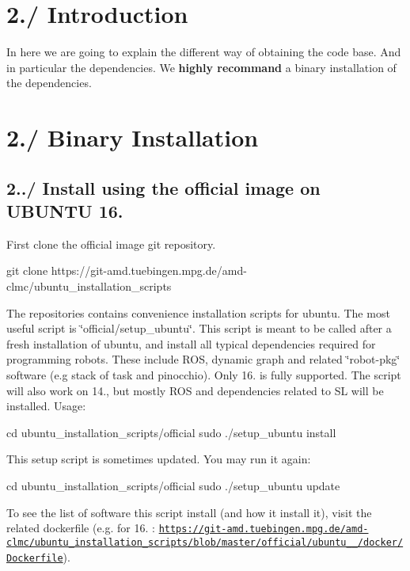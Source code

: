 \hypertarget{subpage_installation_install_sec_introduction}{}\section{2./ Introduction}\label{subpage_installation_install_sec_introduction}
In here we are going to explain the different way of obtaining the code base. And in particular the dependencies. We {\bfseries  highly recommand } a binary installation of the dependencies.\hypertarget{subpage_installation_install_sec_binary}{}\section{2./ Binary Installation}\label{subpage_installation_install_sec_binary}
\hypertarget{subpage_installation_install_subsec_official_image}{}\subsection{2../ Install using the official image on U\+B\+U\+N\+T\+U 16.}\label{subpage_installation_install_subsec_official_image}
First clone the official image git repository. 
\begin{DoxyCode}
git clone https:\textcolor{comment}{//git-amd.tuebingen.mpg.de/amd-clmc/ubuntu\_installation\_scripts}
\end{DoxyCode}
 The repositories contains convenience installation scripts for ubuntu. The most useful script is \char`\"{}official/setup\+\_\+ubuntu\char`\"{}. This script is meant to be called after a fresh installation of ubuntu, and install all typical dependencies required for programming robots. These include R\+OS, dynamic graph and related \char`\"{}robot-\/pkg\char`\"{} software (e.\+g stack of task and pinocchio). Only 16. is fully supported. The script will also work on 14., but mostly R\+OS and dependencies related to SL will be installed. Usage\+: 
\begin{DoxyCode}
cd ubuntu\_installation\_scripts/official
sudo ./setup\_ubuntu install
\end{DoxyCode}
 This setup script is sometimes updated. You may run it again\+: 
\begin{DoxyCode}
cd ubuntu\_installation\_scripts/official
sudo ./setup\_ubuntu update
\end{DoxyCode}
 To see the list of software this script install (and how it install it), visit the related dockerfile (e.\+g. for 16. \+: \href{https://git-amd.tuebingen.mpg.de/amd-clmc/ubuntu_installation_scripts/blob/master/official/ubuntu_16_04/docker/Dockerfile}{\tt https\+://git-\/amd.\+tuebingen.\+mpg.\+de/amd-\/clmc/ubuntu\+\_\+installation\+\_\+scripts/blob/master/official/ubuntu\+\_\+\_/docker/\+Dockerfile}).

